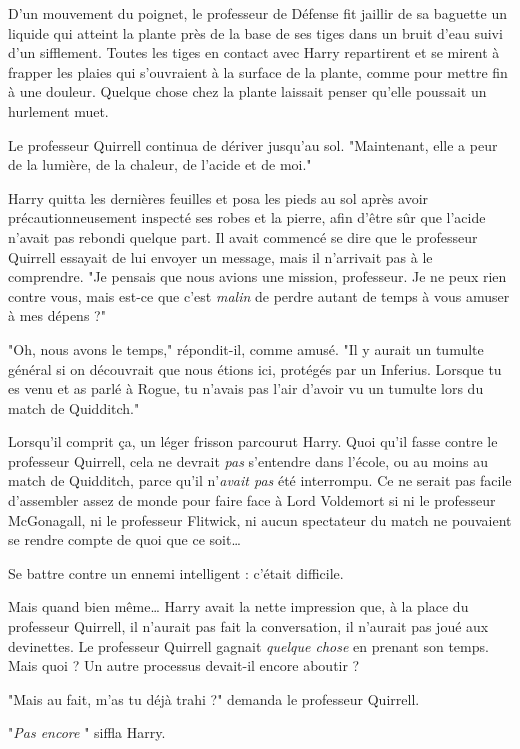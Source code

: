 D'un mouvement du poignet, le professeur de Défense fit jaillir de sa baguette un liquide qui atteint la plante près de la base de ses tiges dans un bruit d'eau suivi d'un sifflement. Toutes les tiges en contact avec Harry repartirent et se mirent à frapper les plaies qui s'ouvraient à la surface de la plante, comme pour mettre fin à une douleur. Quelque chose chez la plante laissait penser qu'elle poussait un hurlement muet.

Le professeur Quirrell continua de dériver jusqu'au sol. "Maintenant, elle a peur de la lumière, de la chaleur, de l'acide et de moi."

Harry quitta les dernières feuilles et posa les pieds au sol après avoir précautionneusement inspecté ses robes et la pierre, afin d'être sûr que l'acide n'avait pas rebondi quelque part. Il avait commencé se dire que le professeur Quirrell essayait de lui envoyer un message, mais il n'arrivait pas à le comprendre. "Je pensais que nous avions une mission, professeur. Je ne peux rien contre vous, mais est-ce que c'est \emph{malin}  de perdre autant de temps à vous amuser à mes dépens ?"

"Oh, nous avons le temps," répondit-il, comme amusé. "Il y aurait un tumulte général si on découvrait que nous étions ici, protégés par un Inferius. Lorsque tu es venu et as parlé à Rogue, tu n'avais pas l'air d'avoir vu un tumulte lors du match de Quidditch."

Lorsqu'il comprit ça, un léger frisson parcourut Harry. Quoi qu'il fasse contre le professeur Quirrell, cela ne devrait \emph{pas}  s'entendre dans l'école, ou au moins au match de Quidditch, parce qu'il n'\emph{avait pas}  été interrompu. Ce ne serait pas facile d'assembler assez de monde pour faire face à Lord Voldemort si ni le professeur McGonagall, ni le professeur Flitwick, ni aucun spectateur du match ne pouvaient se rendre compte de quoi que ce soit…

Se battre contre un ennemi intelligent : c'était difficile.

Mais quand bien même… Harry avait la nette impression que, à la place du professeur Quirrell, il n'aurait pas fait la conversation, il n'aurait pas joué aux devinettes. Le professeur Quirrell gagnait \emph{quelque chose}  en prenant son temps. Mais quoi ? Un autre processus devait-il encore aboutir ?

"Mais au fait, m'as tu déjà trahi ?" demanda le professeur Quirrell.

"\emph{Pas encore} " siffla Harry.

